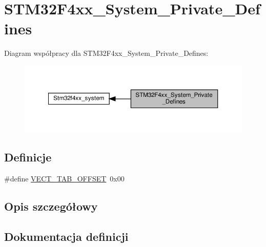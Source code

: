 \hypertarget{group___s_t_m32_f4xx___system___private___defines}{}\section{S\+T\+M32\+F4xx\+\_\+\+System\+\_\+\+Private\+\_\+\+Defines}
\label{group___s_t_m32_f4xx___system___private___defines}
Diagram współpracy dla S\+T\+M32\+F4xx\+\_\+\+System\+\_\+\+Private\+\_\+\+Defines\+:\nopagebreak
\begin{figure}[H]
\begin{center}
\leavevmode
\includegraphics[width=350pt]{group___s_t_m32_f4xx___system___private___defines}
\end{center}
\end{figure}
\subsection*{Definicje}
\begin{DoxyCompactItemize}
\item 
\#define \hyperlink{group___s_t_m32_f4xx___system___private___defines_ga40e1495541cbb4acbe3f1819bd87a9fe}{V\+E\+C\+T\+\_\+\+T\+A\+B\+\_\+\+O\+F\+F\+S\+ET}~0x00
\end{DoxyCompactItemize}


\subsection{Opis szczegółowy}


\subsection{Dokumentacja definicji}
\mbox{\label{group___s_t_m32_f4xx___system___private___defines_ga40e1495541cbb4acbe3f1819bd87a9fe}} 
